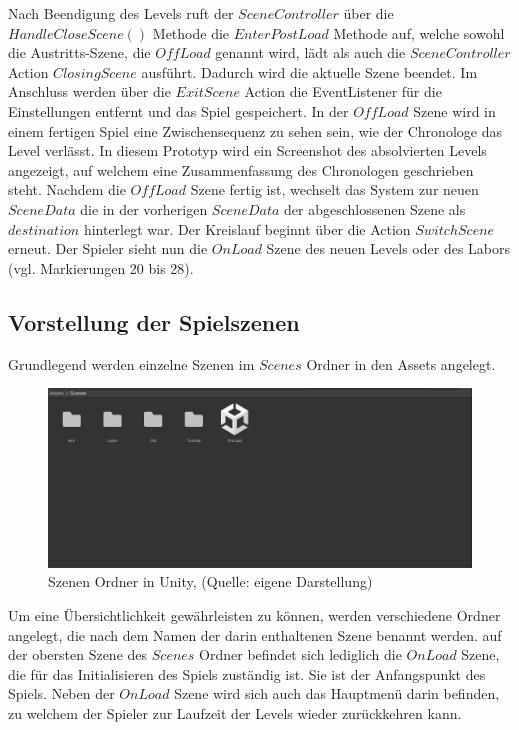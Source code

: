 Nach Beendigung des Levels ruft der $SceneController$ über die $HandleCloseScene()$ Methode die $EnterPostLoad$ Methode auf, welche 
 sowohl die Austritts-Szene, die $OffLoad$ genannt wird, lädt als auch die $SceneController$ Action $ClosingScene$ ausführt. Dadurch wird die aktuelle Szene beendet. Im Anschluss werden über die $ExitScene$ Action die EventListener für die Einstellungen entfernt und das Spiel gespeichert. In der $OffLoad$ Szene wird in einem fertigen Spiel eine Zwischensequenz zu sehen sein, wie der Chronologe das Level verlässt. In diesem Prototyp wird ein Screenshot des absolvierten Levels angezeigt, auf welchem eine Zusammenfassung des Chronologen geschrieben steht. Nachdem die $OffLoad$ Szene fertig ist, wechselt das System zur neuen $SceneData$ die in der vorherigen $SceneData$ der abgeschlossenen Szene als $destination$ hinterlegt war. Der Kreislauf beginnt über die Action $SwitchScene$ erneut. Der Spieler sieht nun die $OnLoad$ Szene des neuen Levels oder des Labors (vgl. Markierungen 20 bis 28).


\subsection{Vorstellung der Spielszenen}\label{sec:scenes}
Grundlegend werden einzelne Szenen im $Scenes$ Ordner in den Assets angelegt.

\begin{figure}[ht]
\centering
\includegraphics[width=1\linewidth]{content/pictures/Overview.jpg}
\caption{Szenen Ordner in Unity, (Quelle: eigene Darstellung)}
\label{fig:scenes_overview}
\end{figure}

Um eine Übersichtlichkeit gewährleisten zu können, werden verschiedene Ordner angelegt, die nach dem Namen der darin enthaltenen Szene benannt werden. auf der obersten Szene des $Scenes$ Ordner befindet sich lediglich die $OnLoad$ Szene, die für das Initialisieren des Spiels zuständig ist. Sie ist der Anfangspunkt des Spiels. Neben der $OnLoad$ Szene wird sich auch das Hauptmenü darin befinden, zu welchem der Spieler zur Laufzeit der Levels wieder zurückkehren kann. 


